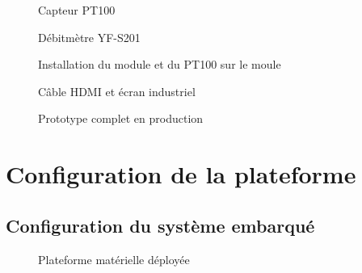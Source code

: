 \begin{figure}[htbp]
  \centering
  \caption{Capteur PT100}
  \label{fig:pt100}
\end{figure}

\begin{figure}[htbp]
  \centering
  \caption{Débitmètre YF-S201}
  \label{fig:yfs201}
\end{figure}

\begin{figure}[htbp]
  \centering
  \caption{Installation du module et du PT100 sur le moule}
  \label{fig:installation_moule}
\end{figure}

\begin{figure}[htbp]
  \centering
  \caption{Câble HDMI et écran industriel}
  \label{fig:hdmi_ecran}
\end{figure}

\begin{figure}[htbp]
  \centering
  \caption{Prototype complet en production}
  \label{fig:prototype}
\end{figure}

\section{Configuration de la plateforme}

\subsection{Configuration du système embarqué}

\begin{figure}[htbp]
  \centering
  \caption{Plateforme matérielle déployée}
  \label{fig:rpi_setup}
\end{figure}

